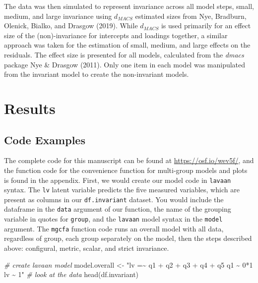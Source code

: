 \documentclass[
  man]{apa6}
\newenvironment{Shaded}{\begin{snugshade}}{\end{snugshade}}
\newcommand{\CommentTok}[1]{\textcolor[rgb]{0.56,0.35,0.01}{\textit{#1}}}
\newcommand{\FunctionTok}[1]{\textcolor[rgb]{0.00,0.00,0.00}{#1}}
\newcommand{\NormalTok}[1]{#1}
\newcommand{\OtherTok}[1]{\textcolor[rgb]{0.56,0.35,0.01}{#1}}
\newcommand{\StringTok}[1]{\textcolor[rgb]{0.31,0.60,0.02}{#1}}
\begin{document}
The data was then simulated to represent invariance across all model steps, small, medium, and large invariance using \(d_{MACS}\) estimated sizes from Nye, Bradburn, Olenick, Bialko, and Drasgow (2019). While \(d_{MACS}\) is used primarily for an effect size of the (non)-invariance for intercepts and loadings together, a similar approach was taken for the estimation of small, medium, and large effects on the residuals. The effect size is presented for all models, calculated from the \emph{dmacs} package Nye \& Drasgow (2011). Only one item in each model was manipulated from the invariant model to create the non-invariant models.

\hypertarget{results}{%
\section{Results}\label{results}}

\hypertarget{code-examples}{%
\subsection{Code Examples}\label{code-examples}}

The complete code for this manuscript can be found at \url{https://osf.io/wev5f/}, and the function code for the convenience function for multi-group models and plots is found in the appendix. First, we would create our model code in \texttt{lavaan} syntax. The \texttt{lv} latent variable predicts the five measured variables, which are present as columns in our \texttt{df.invariant} dataset. You would include the dataframe in the \texttt{data} argument of our function, the name of the grouping variable in quotes for \texttt{group}, and the \texttt{lavaan} model syntax in the \texttt{model} argument. The \texttt{mgcfa} function code runs an overall model with all data, regardless of group, each group separately on the model, then the steps described above: configural, metric, scalar, and strict invariance.

\small

\begin{Shaded}
\begin{Highlighting}[]
\CommentTok{\# create lavaan model}
\NormalTok{model.overall }\OtherTok{\textless{}{-}} \StringTok{"lv =\textasciitilde{} q1 + q2 + q3 + q4 + q5}
\StringTok{q1 \textasciitilde{} 0*1}
\StringTok{lv \textasciitilde{} 1"}
\CommentTok{\# look at the data}
\FunctionTok{head}\NormalTok{(df.invariant)}
\end{Highlighting}
\end{Shaded}
\end{document}
